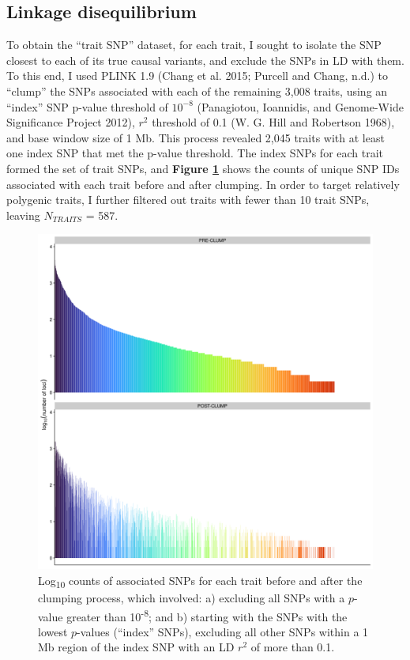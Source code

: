 \documentclass[
]{book}
\begin{document}
\hypertarget{linkage-disequilibrium}{%
\subsection{Linkage disequilibrium}\label{linkage-disequilibrium}}

To obtain the ``trait SNP'' dataset, for each trait, I sought to isolate the SNP closest to each of its true causal variants, and exclude the SNPs in LD with them. To this end, I used PLINK 1.9 (Chang et al. 2015; Purcell and Chang, n.d.) to ``clump'' the SNPs associated with each of the remaining 3,008 traits, using an ``index'' SNP p-value threshold of \(10^{-8}\) (Panagiotou, Ioannidis, and Genome-Wide Significance Project 2012), \(r^2\) threshold of 0.1 (W. G. Hill and Robertson 1968), and base window size of 1 Mb. This process revealed 2,045 traits with at least one index SNP that met the p-value threshold. The index SNPs for each trait formed the set of trait SNPs, and \textbf{Figure \ref{fig:FstSnpCount}} shows the counts of unique SNP IDs associated with each trait before and after clumping. In order to target relatively polygenic traits, I further filtered out traits with fewer than 10 trait SNPs, leaving \(N_{TRAITS}\) = 587.



\begin{figure}
\includegraphics[width=1\linewidth]{figs/fst/0.1_1000_20220314_snp_counts} \caption{Log\textsubscript{10} counts of associated SNPs for each trait before and after the clumping process, which involved: a) excluding all SNPs with a \(p\)-value greater than 10\textsuperscript{-8}; and b) starting with the SNPs with the lowest \(p\)-values (``index'' SNPs), excluding all other SNPs within a 1 Mb region of the index SNP with an LD \(r^2\) of more than 0.1.}\label{fig:FstSnpCount}
\end{figure}
\end{document}
